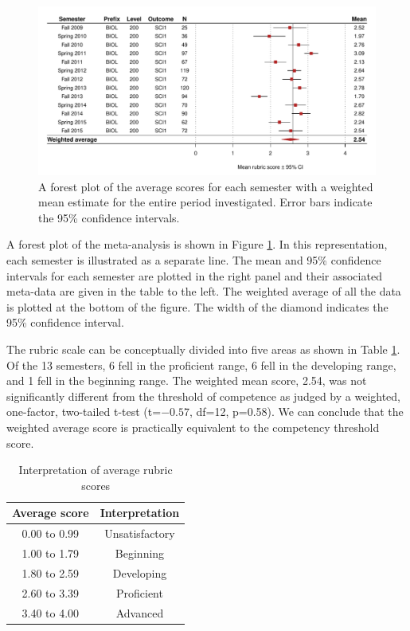 \documentclass[fleqn,10pt]{SelfArx}\usepackage[]{graphicx}\usepackage[]{color}
\begin{document}
\begin{figure}[htb]\centering %

\includegraphics[width=\textwidth]{./figure/forest}
\protect\caption{A forest plot of the average scores for each semester with a weighted mean estimate for the entire period investigated. Error bars indicate the 95\% confidence intervals.}
\label{fig:forest}
\end{figure}



A forest plot of the meta-analysis is shown in Figure \ref{fig:forest}. In this representation, each semester is illustrated as a separate line. The mean and 95\% confidence intervals for each semester are plotted in the right panel and their associated meta-data are given in the table to the left. The weighted average of all the data is plotted at the bottom of the figure. The width of the diamond indicates the 95\% confidence interval.

The rubric scale can be conceptually divided into five areas as shown in Table \ref{tab:regions}. Of the 13 semesters, 6 fell in the proficient range, 6 fell in the developing range, and 1 fell in the beginning range. The weighted mean score, 2.54, was not significantly different from the threshold of competence as judged by a weighted, one-factor, two-tailed t-test (t=\ensuremath{-0.57}, df=12, p=0.58). We can conclude that the weighted average score is practically equivalent to the competency threshold score.

\begin{table}[hbt]
\caption{Interpretation of average rubric scores}
\centering
\begin{tabular}{c c}
\textbf{Average score} & \textbf{Interpretation}   \\
\hline
0.00 to 0.99   &   Unsatisfactory                                \\
1.00 to 1.79   &   Beginning                                     \\
1.80 to 2.59   &   Developing                                    \\
2.60 to 3.39   &   Proficient                                    \\
3.40 to 4.00   &   Advanced                                      \\
\end{tabular}
\label{tab:regions}
\end{table}
\end{document}
